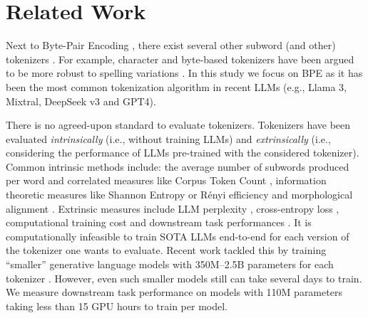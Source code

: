 \section{Related Work}
Next to Byte-Pair Encoding \cite{sennrich-etal-2016-neural}, there exist several other subword (and other) tokenizers \cite{mielke2021between}. %
    For example, character and byte-based tokenizers have been argued to be more robust to spelling variations \cite{mielke2021between, libovicky-etal-2022-dont, xue-etal-2022-byt5}. In this study we focus on BPE as it has been the most common tokenization algorithm in recent LLMs (e.g., Llama 3, Mixtral, DeepSeek v3 and GPT4). 

    There is no agreed-upon standard to evaluate tokenizers. Tokenizers have been evaluated \textit{intrinsically} (i.e., without training LLMs) and \textit{extrinsically} (i.e., considering the performance of LLMs pre-trained with the considered tokenizer). Common intrinsic methods include: the average number of subwords produced per word and correlated measures like Corpus Token Count \cite{rust-etal-2021-good, Scao2022BLOOMA1, ali-etal-2024-tokenizer,galle-2019-investigating,schmidt-etal-2024-tokenization}, %
     information theoretic measures like Shannon Entropy or Rényi efficiency \cite{zouhar-etal-2023-tokenization} and
     morphological alignment \cite{gow-smith-etal-2022-improving, uzan-etal-2024-greed}. 
    Extrinsic measures include LLM perplexity \cite{shliazhko-etal-2024-mgpt,zevallos-bel-2023-hints,gowda-may-2020-finding}, cross-entropy loss \cite{rajaraman2024toward}, computational training cost \cite{ali-etal-2024-tokenizer} and downstream task performances \cite{schmidt-etal-2024-tokenization,ali-etal-2024-tokenizer}. 
    It is computationally infeasible to train SOTA LLMs end-to-end for each version of the tokenizer one wants to evaluate. Recent work tackled this by training ``smaller'' generative language models  with 350M--2.5B parameters for each tokenizer \cite{schmidt-etal-2024-tokenization,ali-etal-2024-tokenizer}. However, even such smaller models still can take several days to train. 
    We measure downstream task performance on models with 110M parameters taking less than 15 GPU hours to train per model. %

